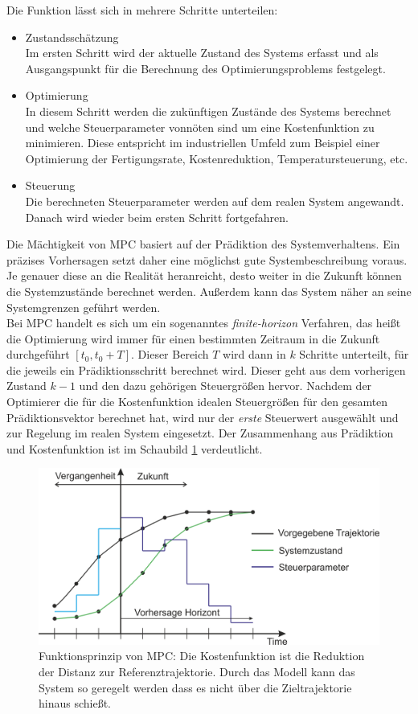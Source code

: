 \documentclass{like}
\begin{document}
Die Funktion lässt sich in mehrere Schritte unterteilen:
\begin{itemize}
	\item Zustandsschätzung \\ Im ersten Schritt wird der aktuelle Zustand des Systems erfasst und als Ausgangspunkt für die Berechnung des Optimierungsproblems festgelegt.
	\item Optimierung \\ In diesem Schritt werden die zukünftigen Zustände des Systems berechnet und welche Steuerparameter vonnöten sind um eine Kostenfunktion zu minimieren. Diese entspricht im industriellen Umfeld zum Beispiel einer Optimierung der Fertigungsrate, Kostenreduktion,  Temperatursteuerung, etc.
	\item Steuerung \\ Die berechneten Steuerparameter werden auf dem realen System angewandt. Danach wird wieder beim ersten Schritt fortgefahren.   
\end{itemize}


Die Mächtigkeit von \ac{MPC} basiert auf der Prädiktion des Systemverhaltens. Ein präzises Vorhersagen setzt daher eine möglichst gute Systembeschreibung voraus. Je genauer diese an die Realität heranreicht, desto weiter in die Zukunft können die Systemzustände berechnet werden. Außerdem kann das System näher an seine Systemgrenzen geführt werden. \\
Bei \acl{MPC} handelt es sich um ein sogenanntes \textit{finite-horizon} Verfahren, das heißt die Optimierung wird immer für einen bestimmten Zeitraum in die Zukunft durchgeführt $ [t_0, t_0 + T] $. Dieser Bereich \(T\) wird dann in \(k\) Schritte unterteilt, für die jeweils ein Prädiktionsschritt berechnet wird. Dieser geht aus dem vorherigen Zustand $k -1$ und den dazu gehörigen Steuergrößen hervor. Nachdem der Optimierer die für die Kostenfunktion idealen Steuergrößen für den gesamten Prädiktionsvektor berechnet hat, wird nur der \emph{erste} Steuerwert ausgewählt und zur Regelung im realen System eingesetzt. Der Zusammenhang aus Prädiktion und Kostenfunktion ist im Schaubild \ref{fig:mpcTheory} verdeutlicht.

\begin{figure}[ht!]
	\centering
	\includegraphics[width=350pt]{Abbildungen/mpcParadigm.png}
	\caption{Funktionsprinzip von \ac{MPC}: Die Kostenfunktion ist die Reduktion der Distanz zur Referenztrajektorie. Durch das Modell kann das System so geregelt werden dass es nicht über die Zieltrajektorie hinaus schießt.}
	\label{fig:mpcTheory}
\end{figure}
\end{document}
